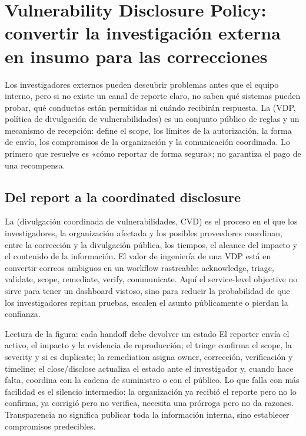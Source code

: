 \section{Vulnerability Disclosure Policy: convertir la investigación externa en insumo para las correcciones}

Los investigadores externos pueden descubrir problemas antes que el equipo interno, pero si no existe un canal de reporte claro, no saben qué sistemas pueden probar, qué conductas están permitidas ni cuándo recibirán respuesta. La  (VDP, política de divulgación de vulnerabilidades) es un conjunto público de reglas y un mecanismo de recepción: define el scope, los límites de la autorización, la forma de envío, los compromisos de la organización y la comunicación coordinada. Lo primero que resuelve es «cómo reportar de forma segura»; no garantiza el pago de una recompensa.

\subsection{Del report a la coordinated disclosure}

La  (divulgación coordinada de vulnerabilidades, CVD) es el proceso en el que los investigadores, la organización afectada y los posibles proveedores coordinan, entre la corrección y la divulgación pública, los tiempos, el alcance del impacto y el contenido de la información. El valor de ingeniería de una VDP está en convertir correos ambiguos en un workflow rastreable: acknowledge, triage, validate, scope, remediate, verify, communicate. Aquí el service-level objective no sirve para tener un dashboard vistoso, sino para reducir la probabilidad de que los investigadores repitan pruebas, escalen el asunto públicamente o pierdan la confianza.


\begin{knowledgebox}{Lectura de la figura: cada handoff debe devolver un estado}
El reporter envía el activo, el impacto y la evidencia de reproducción; el triage confirma el scope, la severity y si es duplicate; la remediation asigna owner, corrección, verificación y timeline; el close/disclose actualiza el estado ante el investigador y, cuando hace falta, coordina con la cadena de suministro o con el público. Lo que falla con más facilidad es el silencio intermedio: la organización ya recibió el reporte pero no lo confirma, ya corrigió pero no verifica, necesita una prórroga pero no da razones. Transparencia no significa publicar toda la información interna, sino establecer compromisos predecibles.
\end{knowledgebox}

